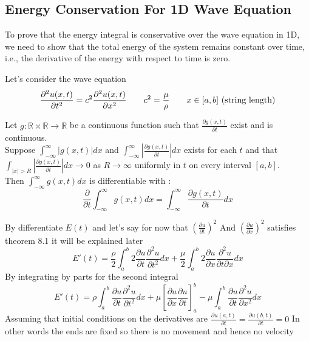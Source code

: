 \documentclass[]{article}
\begin{document}
\subsection{Energy Conservation For 1D Wave Equation}
To prove that the energy integral is conservative over the wave equation in 1D,
we need to show that the total energy of the system remains constant over time, i.e., the derivative of the energy with respect to time is zero.
\par
Let's consider the wave equation
\[
    \frac{\partial^2 u(x,t)}{\partial t^2} = c^2 \frac{\partial^2 u(x,t)}{\partial x^2} \quad\quad c^2 = \frac{\mu}{\rho} \quad\quad x \in [a,b] \text{ (string length)}
\]
\begin{theorem}
    Let $g : \mathbb{R}\times\mathbb{R} \to \mathbb{R}$ be a continuous function such that $\displaystyle \frac{\partial g(x,t)}{\partial t}$ exist and is continuous.
    \\
    Suppose $\displaystyle \int_{-\infty}^{\infty} |g(x,t)| dx $  and   $\displaystyle \int_{-\infty}^{\infty} |\frac{\partial g(x,t)}{\partial t}| dx $ exists for each $t$
    and that $\displaystyle \int_{|x|>R} |\frac{\partial g(x,t)}{\partial t}| dx \to 0 $ as $R \to \infty$ uniformly in $t$ on every interval $[a,b]$.\
    \\
    Then $\displaystyle \int_{-\infty}^{\infty} g(x,t) dx $ is differentiable with :
    \[
        \frac{\partial}{\partial t} \int_{-\infty}^{\infty} g(x,t) dx = \int_{-\infty}^{\infty} \frac{\partial g(x,t)}{\partial t} dx
    \]
\end{theorem}
By differentiate $E(t)$ and let's say for now that 
$\displaystyle {\left(\frac{\partial u}{\partial t}\right)}^2$
And
$\displaystyle {\left(\frac{\partial u}{\partial x}\right)}^2$
satisfies theorem 8.1 it will be explained later 
\[
E'(t) = \frac{\rho}{2} \int_{a}^{b} 2\frac{\partial u}{\partial t}\frac{\partial^2 u}{\partial t^2} dx + \frac{\mu}{2} \int_{a}^{b} 2\frac{\partial u}{\partial x}\frac{\partial^2 u}{\partial t\partial x} dx    
\]
By integrating by parts for the second integral 
\[
E'(t) = \rho \int_{a}^{b} \frac{\partial u}{\partial t}\frac{\partial^2 u}{\partial t^2} dx +\mu\left[\frac{\partial u}{\partial x}\frac{\partial u}{\partial t}\right]_{a}^{b} -\mu \int_{a}^{b} \frac{\partial u}{\partial t}\frac{\partial^2 u}{\partial x^2} dx    
\]
\newpage 
Assuming that initial conditions on the derivatives are
$\displaystyle \frac{\partial u(a,t)}{\partial t} = \frac{\partial u(b,t)}{\partial t} = 0$
In other words the ends are fixed so there is no movement and hence no velocity
\end{document}
